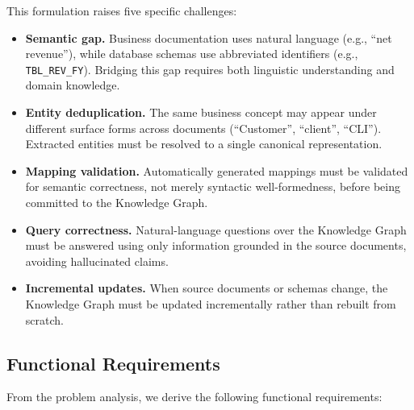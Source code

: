 This formulation raises five specific challenges:

\begin{itemize}
    \item \textbf{Semantic gap.} Business documentation uses natural language (e.g., ``net revenue''), while database schemas use abbreviated identifiers (e.g., \texttt{TBL\_REV\_FY}). Bridging this gap requires both linguistic understanding and domain knowledge.

    \item \textbf{Entity deduplication.} The same business concept may appear under different surface forms across documents (``Customer'', ``client'', ``CLI''). Extracted entities must be resolved to a single canonical representation.

    \item \textbf{Mapping validation.} Automatically generated mappings must be validated for semantic correctness, not merely syntactic well-formedness, before being committed to the Knowledge Graph.

    \item \textbf{Query correctness.} Natural-language questions over the Knowledge Graph must be answered using only information grounded in the source documents, avoiding hallucinated claims.

    \item \textbf{Incremental updates.} When source documents or schemas change, the Knowledge Graph must be updated incrementally rather than rebuilt from scratch.
\end{itemize}

\subsection{Functional Requirements}
\label{sec:sd:functional}

From the problem analysis, we derive the following functional requirements:

